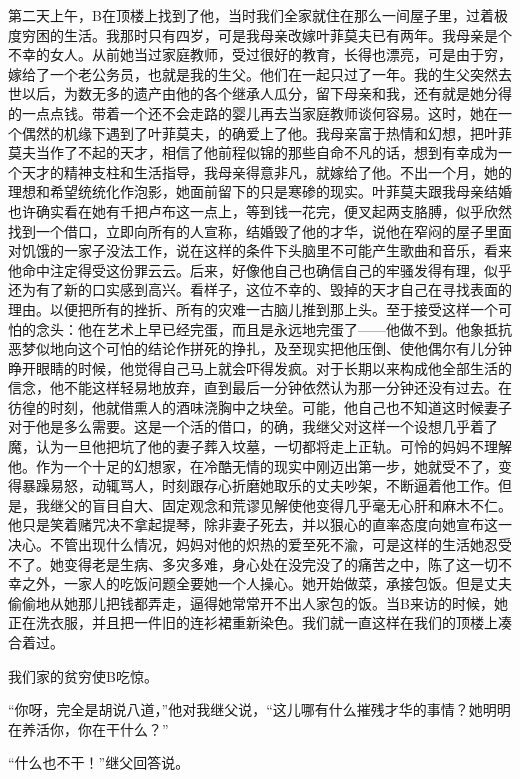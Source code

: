\documentclass[12pt, UTF8]{ctexbook}
\begin{document}
\par 第二天上午，B在顶楼上找到了他，当时我们全家就住在那么一间屋子里，过着极度穷困的生活。我那时只有四岁，可是我母亲改嫁叶菲莫夫已有两年。我母亲是个不幸的女人。从前她当过家庭教师，受过很好的教育，长得也漂亮，可是由于穷，嫁给了一个老公务员，也就是我的生父。他们在一起只过了一年。我的生父突然去世以后，为数无多的遗产由他的各个继承人瓜分，留下母亲和我，还有就是她分得的一点点钱。带着一个还不会走路的婴儿再去当家庭教师谈何容易。这时，她在一个偶然的机缘下遇到了叶菲莫夫，的确爱上了他。我母亲富于热情和幻想，把叶菲莫夫当作了不起的天才，相信了他前程似锦的那些自命不凡的话，想到有幸成为一个天才的精神支柱和生活指导，我母亲得意非凡，就嫁给了他。不出一个月，她的理想和希望统统化作泡影，她面前留下的只是寒碜的现实。叶菲莫夫跟我母亲结婚也许确实看在她有千把卢布这一点上，等到钱一花完，便叉起两支胳膊，似乎欣然找到一个借口，立即向所有的人宣称，结婚毁了他的才华，说他在窄闷的屋子里面对饥饿的一家子没法工作，说在这样的条件下头脑里不可能产生歌曲和音乐，看来他命中注定得受这份罪云云。后来，好像他自己也确信自己的牢骚发得有理，似乎还为有了新的口实感到高兴。看样子，这位不幸的、毁掉的天才自己在寻找表面的理由。以便把所有的挫折、所有的灾难一古脑儿推到那上头。至于接受这样一个可怕的念头：他在艺术上早已经完蛋，而且是永远地完蛋了——他做不到。他象抵抗恶梦似地向这个可怕的结论作拼死的挣扎，及至现实把他压倒、使他偶尔有儿分钟睁开眼睛的时候，他觉得自己马上就会吓得发疯。对于长期以来构成他全部生活的信念，他不能这样轻易地放弃，直到最后一分钟依然认为那一分钟还没有过去。在彷徨的时刻，他就借熏人的酒味浇胸中之块垒。可能，他自己也不知道这时候妻子对于他是多么需要。这是一个活的借口，的确，我继父对这样一个设想几乎着了魔，认为一旦他把坑了他的妻子葬入坟墓，一切都将走上正轨。可怜的妈妈不理解他。作为一个十足的幻想家，在冷酷无情的现实中刚迈出第一步，她就受不了，变得暴躁易怒，动辄骂人，时刻跟存心折磨她取乐的丈夫吵架，不断逼着他工作。但是，我继父的盲目自大、固定观念和荒谬见解使他变得几乎毫无心肝和麻木不仁。他只是笑着赌咒决不拿起提琴，除非妻子死去，并以狠心的直率态度向她宣布这一决心。不管出现什么情况，妈妈对他的炽热的爱至死不渝，可是这样的生活她忍受不了。她变得老是生病、多灾多难，身心处在没完没了的痛苦之中，陈了这一切不幸之外，一家人的吃饭问题全要她一个人操心。她开始做菜，承接包饭。但是丈夫偷偷地从她那儿把钱都弄走，逼得她常常开不出人家包的饭。当B来访的时候，她正在洗衣服，并且把一件旧的连衫裙重新染色。我们就一直这样在我们的顶楼上凑合着过。
\par 我们家的贫穷使B吃惊。
\par “你呀，完全是胡说八道，”他对我继父说，“这儿哪有什么摧残才华的事情？她明明在养活你，你在干什么？”
\par “什么也不干！”继父回答说。
\end{document}
